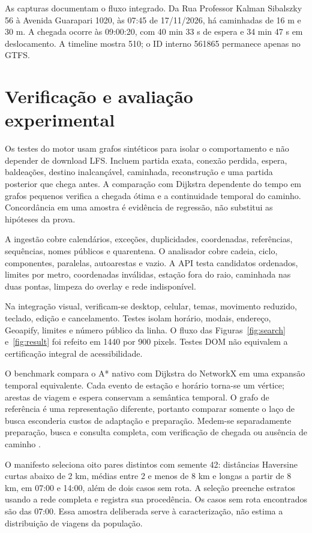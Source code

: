 \documentclass[12pt]{article}
\begin{document}
As capturas documentam o fluxo integrado. Da Rua Professor Kalman Sibalszky 56 à Avenida Guarapari 1020, às 07:45 de 17/11/2026, há caminhadas de 16 m e 30 m. A chegada ocorre às 09:00:20, com 40 min 33 s de espera e 34 min 47 s em deslocamento. A timeline mostra 510; o ID interno 561865 permanece apenas no GTFS.

\section{Verificação e avaliação experimental}
Os testes do motor usam grafos sintéticos para isolar o comportamento e não depender de download LFS. Incluem partida exata, conexão perdida, espera, baldeações, destino inalcançável, caminhada, reconstrução e uma partida posterior que chega antes. A comparação com Dijkstra dependente do tempo em grafos pequenos verifica a chegada ótima e a continuidade temporal do caminho. Concordância em uma amostra é evidência de regressão, não substitui as hipóteses da prova.

A ingestão cobre calendários, exceções, duplicidades, coordenadas, referências, sequências, nomes públicos e quarentena. O analisador cobre cadeia, ciclo, componentes, paralelas, autoarestas e vazio. A API testa candidatos ordenados, limites por metro, coordenadas inválidas, estação fora do raio, caminhada nas duas pontas, limpeza do overlay e rede indisponível.

Na integração visual, verificam-se desktop, celular, temas, movimento reduzido, teclado, edição e cancelamento. Testes isolam horário, modais, endereço, Geoapify, limites e número público da linha. O fluxo das Figuras~\ref{fig:search} e~\ref{fig:result} foi refeito em 1440 por 900 pixels. Testes DOM não equivalem a certificação integral de acessibilidade.

O benchmark compara o A* nativo com Dijkstra do NetworkX em uma expansão temporal equivalente. Cada evento de estação e horário torna-se um vértice; arestas de viagem e espera conservam a semântica temporal. O grafo de referência é uma representação diferente, portanto comparar somente o laço de busca esconderia custos de adaptação e preparação. Medem-se separadamente preparação, busca e consulta completa, com verificação de chegada ou ausência de caminho \cite{networkx}.

O manifesto seleciona oito pares distintos com semente 42: distâncias Haversine curtas abaixo de 2 km, médias entre 2 e menos de 8 km e longas a partir de 8 km, em 07:00 e 14:00, além de dois casos sem rota. A seleção preenche estratos usando a rede completa e registra sua procedência. Os casos sem rota encontrados são das 07:00. Essa amostra deliberada serve à caracterização, não estima a distribuição de viagens da população.
\end{document}
